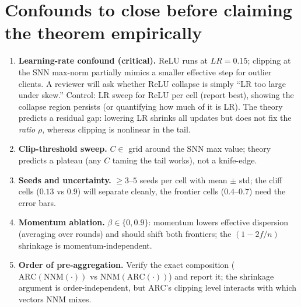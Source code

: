 \documentclass[11pt]{article}
\begin{document}
\section{Confounds to close before claiming the theorem empirically}

\begin{enumerate}[leftmargin=2em]
\item \textbf{Learning-rate confound (critical).} ReLU runs at $LR = 0.15$;
clipping at the SNN max-norm partially mimics a smaller effective step for
outlier clients. A reviewer will ask whether ReLU collapse is simply ``LR too
large under skew.'' Control: LR sweep for ReLU per cell (report best), showing
the collapse region persists (or quantifying how much of it is LR). The theory
predicts a residual gap: lowering LR shrinks all updates but does not fix the
\emph{ratio} $\rho$, whereas clipping is nonlinear in the tail.
\item \textbf{Clip-threshold sweep.} $C \in$ grid around the SNN max value;
theory predicts a plateau (any $C$ taming the tail works), not a knife-edge.
\item \textbf{Seeds and uncertainty.} $\ge 3$--$5$ seeds per cell with
mean $\pm$ std; the cliff cells ($0.13$ vs $0.9$) will separate cleanly, the
frontier cells ($0.4$--$0.7$) need the error bars.
\item \textbf{Momentum ablation.} $\beta \in \{0, 0.9\}$: momentum lowers
effective dispersion (averaging over rounds) and should shift both frontiers;
the $(1-2f/n)$ shrinkage is momentum-independent.
\item \textbf{Order of pre-aggregation.} Verify the exact composition
($\mathrm{ARC}(\mathrm{NNM}(\cdot))$ vs $\mathrm{NNM}(\mathrm{ARC}(\cdot))$)
and report it; the shrinkage argument is order-independent, but ARC's clipping
level interacts with which vectors NNM mixes.
\end{enumerate}
\end{document}
